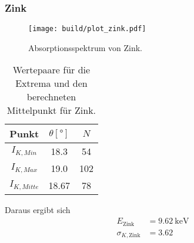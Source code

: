 \clearpage
\subsubsection*{Zink}
\begin{figure}[H]
    \centering
    \texttt{[image: build/plot\_zink.pdf]}
    \caption{Absorptionsspektrum von Zink.}
    \label{fig:zink}
\end{figure}
\begin{table}[H]                                                                                   
    \centering                                                                                     
        \caption{Wertepaare für die Extrema und den berechneten Mittelpunkt für Zink.}                      
        \label{tab:Zn}                                                                        
        \begin{tabular}{S S[table-format=2.2] S}                                                   
          \toprule                                                                                 
          {Punkt} & {$\theta [\si{\degree}]$} & {$N$}\\                                            
          \midrule                                                                                 
          {$I_{K,Min  }$} & 18.3  &54   \\
          {$I_{K,Max  }$} & 19.0  &102  \\
          {$I_{K,Mitte}$} & 18.67 &78   \\
          \bottomrule                                                                              
        \end{tabular}                                                                              
      \end{table}                                                                                  
Daraus ergibt sich                                                                                 
\begin{align*}                                                                                     
    E_\text{Zink} &= \SI{9.62}{\kilo\electronvolt}\\                  
    \sigma_{K, \text{Zink}} &= \num{3.62}                      
\end{align*}                                                                                       

